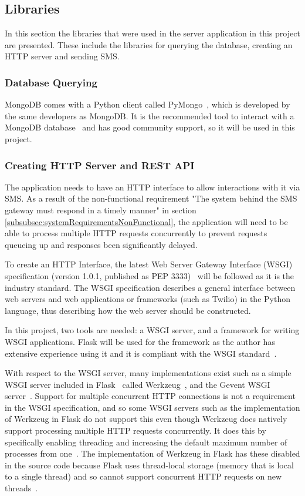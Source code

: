 \documentclass[authoryearcitations]{UoYCSproject}
\begin{document}
\subsection{Libraries}
In this section the libraries that were used in the server application in this project are presented. These include the libraries for querying the database, creating an HTTP server and sending SMS.

\subsubsection{Database Querying}
MongoDB comes with a Python client called PyMongo~\cite{libraryPyMongo}, which is developed by the same developers as MongoDB.  It is the recommended tool to interact with a MongoDB database~\cite{pyMongoDoc} and has good community support, so it will be used in this project.

\subsubsection{Creating HTTP Server and REST API}
The application needs to have an HTTP interface to allow interactions with it via SMS.  As a result of the non-functional requirement "The system behind the SMS gateway must respond in a timely manner" in section \ref{subsubsec:systemRequirementsNonFunctional}, the application will need to be able to process multiple HTTP requests concurrently to prevent requests queueing up and responses been significantly delayed.

To create an HTTP Interface, the latest Web Server Gateway Interface (WSGI) specification (version 1.0.1, published as PEP 3333)~\cite{eby2010python} will be followed as it is the industry standard. The WSGI specification describes a general interface between web servers and web applications or frameworks (such as Twilio) in the Python language, thus describing how the web server should be constructed.

In this project, two tools are needed: a WSGI server, and a framework for writing WSGI applications. Flask will be used for the framework as the author has extensive experience using it and it is compliant with the WSGI standard~\cite{libraryFlask}.

With respect to the WSGI server, many implementations exist such as a simple WSGI server included in Flask~\cite{libraryFlask} called Werkzeug~\cite{libraryWerkzeug}, and the Gevent WSGI server~\cite{libraryGevent}.  Support for multiple concurrent HTTP connections is not a requirement in the WSGI specification, and so some WSGI servers such as the implementation of Werkzeug in Flask do not support this even though Werkzeug does natively support processing multiple HTTP requests concurrently. It does this by specifically enabling threading and increasing the default maximum number of processes from one~\cite{werkzeugThreading}. The implementation of Werkzeug in Flask has these disabled in the source code because Flask uses thread-local storage (memory that is local to a single thread) and so cannot support concurrent HTTP requests on new threads~\cite{flaskThreading}.
\end{document}
